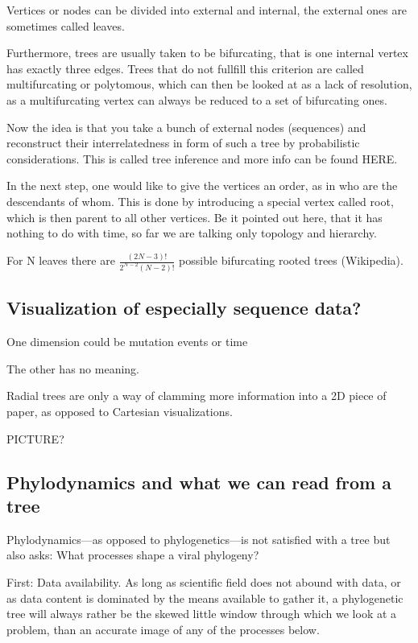 \documentclass[12pt]{scrartcl}
\begin{document}
  Vertices or nodes can be divided into external and internal, the external ones are sometimes called leaves.

  Furthermore, trees are usually taken to be bifurcating, that is one internal vertex has exactly three edges. Trees that do not fullfill this criterion are called multifurcating or polytomous, which can then be looked at as a lack of resolution, as a multifurcating vertex can always be reduced to a set of bifurcating ones.

  Now the idea is that you take a bunch of external nodes (sequences) and reconstruct their interrelatedness in form of such a tree by probabilistic considerations. This is called tree inference and more info can be found HERE.

  In the next step, one would like to give the vertices an order, as in who are the descendants of whom. This is done by introducing a special vertex called root, which is then parent to all other vertices. Be it pointed out here, that it has nothing to do with time, so far we are talking only topology and hierarchy.

  For N leaves there are $\frac{(2N - 3)!}{2^{N-2}(N-2)!}$ possible bifurcating rooted trees (Wikipedia).

  \subsection{Visualization of especially sequence data?}

  One dimension could be mutation events or time

  The other has no meaning.

  Radial trees are only a way of clamming more information into a 2D piece of paper, as opposed to Cartesian visualizations.

  PICTURE?

  \subsection{Phylodynamics and what we can read from a tree}

  Phylodynamics---as opposed to phylogenetics---is not satisfied with a tree but also asks: What processes shape a viral phylogeny?

  First: Data availability. As long as scientific field does not abound with data, or as data content is dominated by the means available to gather it, a phylogenetic tree will always rather be the skewed little window through which we look at a problem, than an accurate image of any of the processes below.
\end{document}
